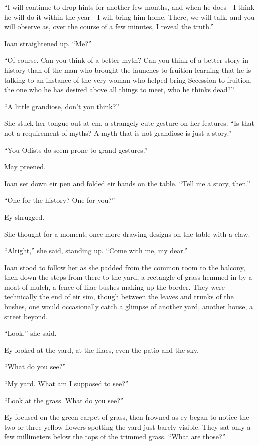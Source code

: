 ``I will continue to drop hints for another few months, and when he does---I think he will do it within the year---I will bring him home. There, we will talk, and you will observe as, over the course of a few minutes, I reveal the truth.''

Ioan straightened up. ``Me?''

``Of course. Can you think of a better myth? Can you think of a better story in history than of the man who brought the launches to fruition learning that he is talking to an instance of the very woman who helped bring Secession to fruition, the one who he has desired above all things to meet, who he thinks dead?''

``A little grandiose, don't you think?''

She stuck her tongue out at em, a strangely cute gesture on her features. ``Is that not a requirement of myths? A myth that is not grandiose is just a story.''

``You Odists do seem prone to grand gestures.''

May preened.

Ioan set down eir pen and folded eir hands on the table. ``Tell me a story, then.''

``One for the history? One for you?''

Ey shrugged.

She thought for a moment, once more drawing designs on the table with a claw.

``Alright,'' she said, standing up. ``Come with me, my dear.''

Ioan stood to follow her as she padded from the common room to the balcony, then down the steps from there to the yard, a rectangle of grass hemmed in by a moat of mulch, a fence of lilac bushes making up the border. They were technically the end of eir sim, though between the leaves and trunks of the bushes, one would occasionally catch a glimpse of another yard, another house, a street beyond.

``Look,'' she said.

Ey looked at the yard, at the lilacs, even the patio and the sky.

``What do you see?''

``My yard. What am I supposed to see?''

``Look at the grass. What do you see?''

Ey focused on the green carpet of grass, then frowned as ey began to notice the two or three yellow flowers spotting the yard just barely visible. They sat only a few millimeters below the tops of the trimmed grass. ``What are those?''

